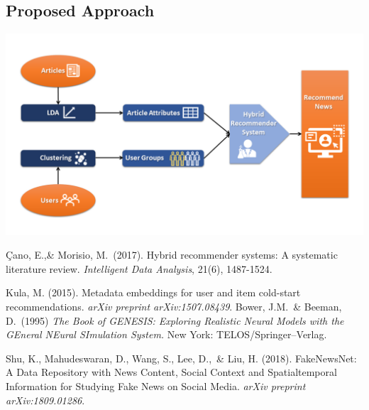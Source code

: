 \documentclass{article}
\begin{document}
\subsection{Proposed Approach}
\includegraphics[scale=.50]{NeuRIPS2019/Slide1.PNG}

\begin{thebibliography}{9}

 Çano, E.,\& Morisio, M.\ (2017). Hybrid recommender systems: A systematic literature review. {\it Intelligent Data Analysis}, 21(6), 1487-1524.

 Kula, M. (2015). Metadata embeddings for user and item cold-start recommendations. {\it arXiv preprint arXiv:1507.08439}.
Bower, J.M.\ \& Beeman, D.\ (1995) {\it The Book of GENESIS: Exploring
  Realistic Neural Models with the GEneral NEural SImulation System.}  New York:
TELOS/Springer--Verlag.

 Shu, K., Mahudeswaran, D., Wang, S., Lee, D.,\ \& Liu, H. (2018). FakeNewsNet: A Data Repository with News Content, Social Context and Spatialtemporal Information for Studying Fake News on Social Media. {\it arXiv preprint arXiv:1809.01286}.

\end{thebibliography}
\end{document}
